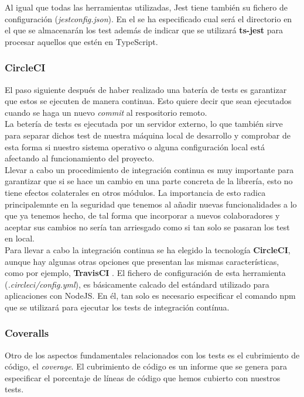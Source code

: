 Al igual que todas las herramientas utilizadas, Jest tiene también su fichero de configuración (\textit{jestconfig.json}). En el se ha especificado cual será el directorio en el que se almacenarán los test además de indicar que se utilizará \textbf{ts-jest} para procesar aquellos que estén en TypeScript.
 
 \subsubsection{CircleCI}
 
 El paso siguiente después de haber realizado una batería de tests es garantizar que estos se ejecuten de manera continua. Esto quiere decir que sean ejecutados cuando se haga un nuevo \textit{commit} al respositorio remoto. \\
 
 La betería de tests es ejecutada por un servidor externo, lo que también sirve para separar dichos test de nuestra máquina local de desarrollo y comprobar de esta forma si nuestro sistema operativo o alguna configuración local está afectando al funcionamiento del proyecto. \\
 
 Llevar a cabo un procedimiento de integración continua es muy importante para garantizar que si se hace un cambio en una parte concreta de la librería, esto no tiene efectos colaterales en otros módulos. La importancia de esto radica principalemnte en la seguridad que tenemos al añadir nuevas funcionalidades a lo que ya tenemos hecho, de tal forma que incorporar a nuevos colaboradores y aceptar sus cambios no sería tan arriesgado como si tan solo se pasaran los test en local.\\
 
 Para llevar a cabo la integración continua se ha elegido la tecnología \textbf{CircleCI}, aunque hay algunas otras opciones que presentan las mismas características, como por ejemplo, \textbf{TravisCI} \cite{travis}. El fichero de configuración de esta herramienta (\textit{.circleci/config.yml}), es básicamente calcado del estándard utilizado para aplicaciones con NodeJS. En él, tan solo es necesario especificar el comando npm que se utilizará para ejecutar los tests de integración contínua.
 
 \subsubsection{Coveralls}
 
 Otro de los aspectos fundamentales relacionados con los tests es el cubrimiento de código, el \textit{coverage}. El cubrimiento de código es un informe que se genera para especificar el porcentaje de líneas de código que hemos cubierto con nuestros tests. \\
 
